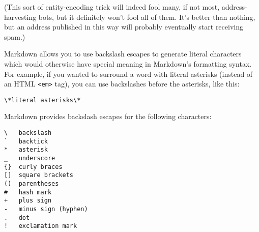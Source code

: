 (This sort of entity-encoding trick will indeed fool many, if not
most, address-harvesting bots, but it definitely won't fool all of
them. It's better than nothing, but an address published in this way
will probably eventually start receiving spam.)

Markdown allows you to use backslash escapes to generate literal
characters which would otherwise have special meaning in Markdown's
formatting syntax. For example, if you wanted to surround a word
with literal asterisks (instead of an HTML \texttt{<em>} tag), you can use
backslashes before the asterisks, like this:

\begin{verbatim}
\*literal asterisks\*
\end{verbatim}

Markdown provides backslash escapes for the following characters:

\begin{verbatim}
\   backslash
`   backtick
*   asterisk
_   underscore
{}  curly braces
[]  square brackets
()  parentheses
#   hash mark
+   plus sign
-   minus sign (hyphen)
.   dot
!   exclamation mark
\end{verbatim}
